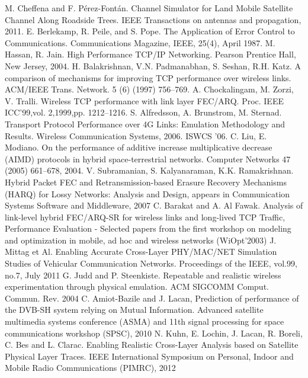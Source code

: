 \documentclass[conference,letterpaper]{IEEEtran}
\begin{document}
\begin{thebibliography}{1}
 M. Cheffena and F. P\'{e}rez-Font\'{a}n. Channel Simulator for Land Mobile Satellite Channel Along Roadside Trees. IEEE Transactions on antennas and propagation, 2011.
 E. Berlekamp, R. Peile, and S. Pope. The Application of Error Control to Communications. Communications Magazine, IEEE, 25(4), April 1987.
 M. Hassan, R. Jain. High Performance TCP/IP Networking. Pearson Prentice Hall, New Jersey, 2004.
 H. Balakrishnan, V.N. Padmanabhan, S. Seshan, R.H. Katz. A comparison of mechanisms for improving TCP performance over wireless links. ACM/IEEE Trans. Network. 5 (6) (1997) 756–769.
 A. Chockalingam, M. Zorzi, V. Tralli. Wireless TCP performance with link layer FEC/ARQ. Proc. IEEE ICC'99,vol. 2,1999,pp. 1212–1216.
 S. Alfredsson, A. Brunstrom, M. Sternad. Transport Protocol Performance over 4G Links: Emulation Methodology and Results.  Wireless Communication Systems, 2006. ISWCS '06.
 C. Liu, E. Modiano. On the performance of additive increase multiplicative decrease (AIMD) protocols in hybrid space-terrestrial networks. Computer Networks 47 (2005) 661–678, 2004.
 V. Subramanian, S. Kalyanaraman, K.K. Ramakrishnan. Hybrid Packet FEC and Retransmission-based Erasure Recovery Mechanisms (HARQ) for Lossy Networks: Analysis and Design, appears in Communication Systems Software and Middleware, 2007
 C. Barakat and A. Al Fawak. Analysis of link-level hybrid FEC/ARQ-SR for wireless links and long-lived TCP Traffic, Performance Evaluation - Selected papers from the first workshop on modeling and optimization in mobile, ad hoc and wireless networks (WiOpt'2003)
 J. Mittag et Al. Enabling Accurate Cross-Layer PHY/MAC/NET Simulation Studies of Vehicular Communication Networks. Proceedings of the IEEE, vol.99, no.7, July 2011
 G. Judd and P. Steenkiste. Repeatable and realistic wireless experimentation through physical emulation. ACM SIGCOMM Comput. Commun. Rev. 2004
 C. Amiot-Bazile and J. Lacan, Prediction of performance of the DVB-SH system relying on Mutual Information. Advanced satellite multimedia systems conference (ASMA) and 11th signal processing for space communications workshop (SPSC), 2010
 N. Kuhn, E. Lochin, J. Lacan, R. Boreli, C. Bes and L. Clarac. Enabling Realistic Cross-Layer Analysis based on Satellite Physical Layer Traces. IEEE International Symposium on Personal, Indoor and Mobile Radio Communications (PIMRC), 2012

\end{thebibliography}
\end{document}

